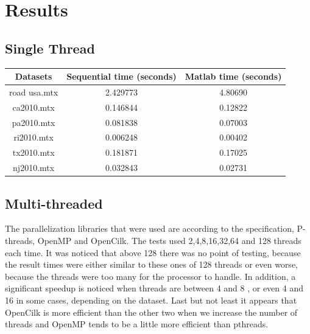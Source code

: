 \documentclass[11pt]{article}
\begin{document}
\section{Results}
\label{sec:orgf71dbf2}
\subsection{Single Thread}
\label{sec:orgd030b4d}
\begin{center}
\begin{tabular}{|c|c|c|}
\hline
Datasets & Sequential time (seconds) & Matlab time (seconds)\\[0pt]
\hline
road usa.mtx & 2.429773 & 4.80690\\[0pt]
ca2010.mtx & 0.146844 & 0.12822\\[0pt]
pa2010.mtx & 0.081838 & 0.07003\\[0pt]
ri2010.mtx & 0.006248 & 0.00402\\[0pt]
tx2010.mtx & 0.181871 & 0.17025\\[0pt]
nj2010.mtx & 0.032843 & 0.02731\\[0pt]
\hline
\end{tabular}
\end{center}
\subsection{Multi-threaded}
\label{sec:org459b173}
The parallelization libraries that were used are according to the specification, P-threads, OpenMP and OpenCilk. The tests used 2,4,8,16,32,64 and 128 threads each time. It was noticed that above 128 there was no point of testing, because the result times were either similar to these ones of 128 threads or even worse, because the threads were too many for the processor to handle. In addition, a significant speedup is noticed when threads are between 4 and 8 , or even 4 and 16 in some cases, depending on the dataset. Last but not least it appears that OpenCilk is more efficient than the other two when we increase the number of threads and OpenMP tends to be a little more efficient than pthreads.
\pagebreak
\end{document}
